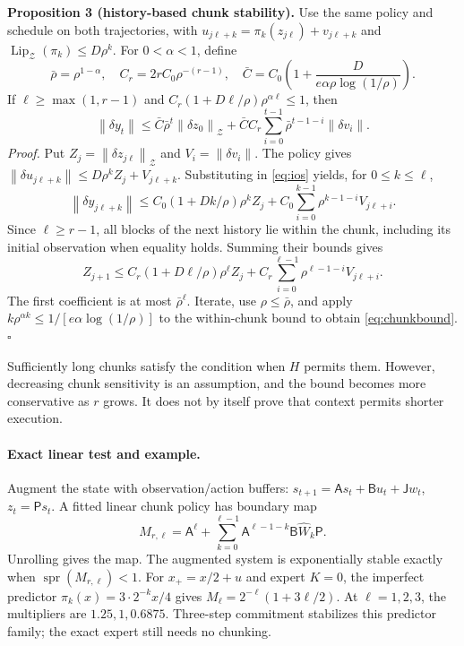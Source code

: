 \documentclass[11pt]{article}
\newcommand{\norm}[1]{\left\lVert#1\right\rVert}
\newcommand{\spr}{\operatorname{spr}}
\begin{document}
\textbf{Proposition 3 (history-based chunk stability).} Use the same policy and schedule on both trajectories, with $u_{j\ell+k}=\pi_k(z_{j\ell})+v_{j\ell+k}$ and $\operatorname{Lip}_{\mathcal Z}(\pi_k)\le D\rho^k$. For $0<\alpha<1$, define
\[
\bar\rho=\rho^{1-\alpha},\quad C_r=2rC_0\rho^{-(r-1)},\quad
\bar C=C_0\left(1+\frac{D}{e\alpha\rho\log(1/\rho)}\right).
\]
If $\ell\ge\max(1,r-1)$ and $C_r(1+D\ell/\rho)\rho^{\alpha\ell}\le1$, then
\begin{equation}
\norm{\delta y_t}\le\bar C\bar\rho^t\norm{\delta z_0}_{\mathcal Z}
+\bar CC_r\sum_{i=0}^{t-1}\bar\rho^{t-1-i}\norm{\delta v_i}.
\label{eq:chunkbound}
\end{equation}
\emph{Proof.} Put $Z_j=\norm{\delta z_{j\ell}}_{\mathcal Z}$ and $V_i=\norm{\delta v_i}$. The policy gives $\norm{\delta u_{j\ell+k}}\le D\rho^kZ_j+V_{j\ell+k}$. Substituting in \eqref{eq:ios} yields, for $0\le k\le\ell$,
\[
\norm{\delta y_{j\ell+k}}\le C_0(1+Dk/\rho)\rho^kZ_j
+C_0\sum_{i=0}^{k-1}\rho^{k-1-i}V_{j\ell+i}.
\]
Since $\ell\ge r-1$, all blocks of the next history lie within the chunk, including its initial observation when equality holds. Summing their bounds gives
\[
Z_{j+1}\le C_r(1+D\ell/\rho)\rho^\ell Z_j
+C_r\sum_{i=0}^{\ell-1}\rho^{\ell-1-i}V_{j\ell+i}.
\]
The first coefficient is at most $\bar\rho^\ell$. Iterate, use $\rho\le\bar\rho$, and apply $k\rho^{\alpha k}\le1/[e\alpha\log(1/\rho)]$ to the within-chunk bound to obtain \eqref{eq:chunkbound}. $\square$

Sufficiently long chunks satisfy the condition when $H$ permits them. However, decreasing chunk sensitivity is an assumption, and the bound becomes more conservative as $r$ grows. It does not by itself prove that context permits shorter execution.

\paragraph{Exact linear test and example.}
Augment the state with observation/action buffers: $s_{t+1}=\mathsf As_t+\mathsf Bu_t+\mathsf Jw_t$, $z_t=\mathsf Ps_t$. A fitted linear chunk policy has boundary map
\begin{equation}
M_{r,\ell}=\mathsf A^\ell+\sum_{k=0}^{\ell-1}\mathsf A^{\ell-1-k}\mathsf B\widehat W_k\mathsf P.
\label{eq:lift}
\end{equation}
Unrolling gives the map. The augmented system is exponentially stable exactly when $\spr(M_{r,\ell})<1$. For $x_+=x/2+u$ and expert $K=0$, the imperfect predictor $\pi_k(x)=3\cdot2^{-k}x/4$ gives $M_\ell=2^{-\ell}(1+3\ell/2)$. At $\ell=1,2,3$, the multipliers are $1.25,1,0.6875$. Three-step commitment stabilizes this predictor family; the exact expert still needs no chunking.
\end{document}

